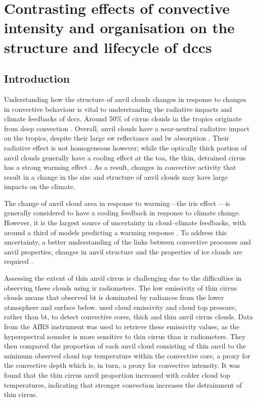 \chapter{Contrasting effects of convective intensity and organisation on the structure and lifecycle of \acrshort{dcc}s} \label{chp:anvil_structure}

\section{Introduction}

Understanding how the structure of anvil clouds changes in response to changes in convective behaviour is vital to understanding the radiative impacts and climate feedbacks of \acrshort{dcc}s.
Around 50\% of cirrus clouds in the tropics originate from deep convection \citep{massie_distribution_2002, luo_characterizing_2004}.
Overall, anvil clouds have a near-neutral radiative impact on the tropics, despite their large \acrshort{sw} reflectance and \acrshort{lw} absorption \citep{hartmann_effect_1992, hartmann_tropical_2016}.
Their radiative effect is not homogeneous however; while the optically thick portion of anvil clouds generally have a cooling effect at the \acrshort{toa}, the thin, detrained cirrus has a strong warming effect \citep{berry_cloud_2014}.
As a result, changes in convective activity that result in a change in the size and structure of anvil clouds may have large impacts on the climate.

The change of anvil cloud area in response to warming---the iris effect \citep{lindzen_does_2001, bony_thermodynamic_2016}---is generally considered to have a cooling feedback in response to climate change.
However, it is the largest source of uncertainty in cloud--climate feedbacks, with around a third of models predicting a warming response \citep{sherwood_assessment_2020}.
To address this uncertainty, a better understanding of the links between convective processes and anvil properties, changes in anvil structure and the properties of ice clouds are required \citep{gasparini_opinion_2023}.

Assessing the extent of thin anvil cirrus is challenging due to the difficulties in observing these clouds using \acrshort{ir} radiometers.
The low emissivity of thin cirrus clouds means that observed \acrshort{bt} is dominated by radiances from the lower atmosphere and surface below.
\citet{protopapadaki_upper_2017} used cloud emissivity and cloud top pressure, rather than \acrshort{bt}, to detect convective cores, thick and thin anvil cirrus clouds.
Data from the AIRS instrument was used to retrieve these emissivity values, as the hyperspectral sounder is more sensitive to thin cirrus than \acrshort{ir} radiometers.
They then compared the proportion of each anvil cloud consisting of thin anvil to the minimum observed cloud top temperature within the convective core, a proxy for the convective depth which is, in turn, a proxy for convective intensity.
It was found that the thin cirrus anvil proportion increased with colder cloud top temperatures, indicating that stronger convection increases the detrainment of thin cirrus.

